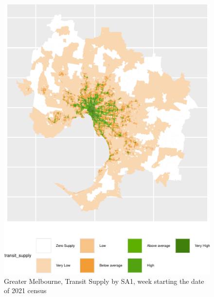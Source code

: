 \documentclass[preprint, 3p,
authoryear]{elsarticle} %
\begin{document}
\begin{figure}
\centering
\includegraphics{Leveraging_GTFS_to_assess_transit_supply_Transport_Geography_files/figure-latex/Greater_Melbourne_SA1_2021_plot-1.pdf}
\caption{Greater Melbourne, Transit Supply by SA1, week starting the
date of 2021 census}
\end{figure}


\end{document}
